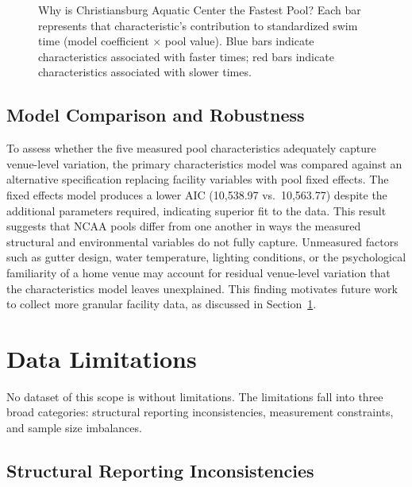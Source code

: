 \documentclass[12pt]{article}
\begin{document}
\begin{figure}[h]
  \centering
  \caption{Why is Christiansburg Aquatic Center the Fastest Pool? Each bar
  represents that characteristic's contribution to standardized swim time
  (model coefficient $\times$ pool value). Blue bars indicate characteristics
  associated with faster times; red bars indicate characteristics associated
  with slower times.}
  \label{fig:contribution}
\end{figure}

\subsection{Model Comparison and Robustness}

To assess whether the five measured pool characteristics adequately capture
venue-level variation, the primary characteristics model was compared against an
alternative specification replacing facility variables with pool fixed effects.
The fixed effects model produces a lower AIC (10,538.97 vs.\ 10,563.77) despite
the additional parameters required, indicating superior fit to the data. This
result suggests that NCAA pools differ from one another in ways the measured
structural and environmental variables do not fully capture. Unmeasured factors
such as gutter design, water temperature, lighting conditions, or the
psychological familiarity of a home venue may account for residual venue-level
variation that the characteristics model leaves unexplained. This finding
motivates future work to collect more granular facility data, as discussed in
Section~\ref{sec:limitations}.

\section{Data Limitations}
\label{sec:limitations}

No dataset of this scope is without limitations. The limitations fall into
three broad categories: structural reporting inconsistencies, measurement
constraints, and sample size imbalances.

\subsection{Structural Reporting Inconsistencies}
\end{document}
